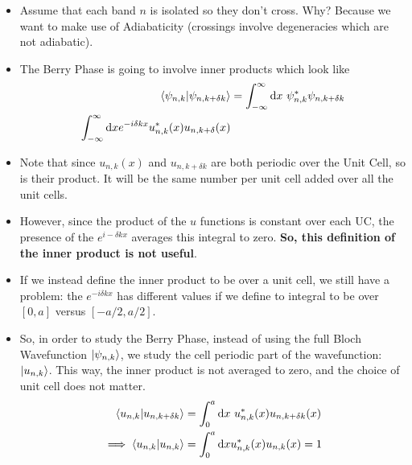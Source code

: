 \documentclass[11pt]{article}
\begin{document}
\begin{itemize}
  \item Assume that each band $n$ is isolated so they don't cross. Why? Because we want to make use of Adiabaticity (crossings involve degeneracies which are not adiabatic).
  \item The Berry Phase is going to involve inner products which look like 
  \begin{align*}
    \langle \psi_{n,k} | \psi_{n,k+\delta k} \rangle &= \int_{-\infty}^{\infty} \mathrm{d}x ~ \psi^*_{n,k} \psi_{n, k+ \delta k} \\
    \int_{-\infty}^{\infty} \mathrm{d}x e^{-i\delta kx} u^*_{n,k}(x) u_{n,k+\delta }(x)
  \end{align*}
  \item Note that since $u_{n,k}(x)$ and $u_{n, k + \delta k}$ are both periodic over the Unit Cell, so is their product. It will be the same number per unit cell added over all the unit cells.
  \item However, since the product of the $u$ functions is constant over each UC, the presence of the $e^{i-\delta k x}$ averages this integral to zero. \textbf{So, this definition of the inner product is not useful}. 
  \item If we instead define the inner product to be over a unit cell, we still have a problem: the $e^{-i\delta k x}$ has different values if we define to integral to be over $[0, a]$ versus $[-a/2, a/2]$.
  \item So, in order to study the Berry Phase, instead of using the full Bloch Wavefunction $\lvert\psi_{n,k}\rangle$, we study the cell periodic part of the wavefunction: $\lvert u_{n,k}\rangle$. This way, the inner product is not averaged to zero, and the choice of unit cell does not matter. 
  \begin{align*}
    \langle u_{n,k} | u_{n,k+\delta k} \rangle &= \int_{0}^{a} \mathrm{d}x ~ u^*_{n,k}(x) u_{n, k + \delta k}(x) \\
    \implies \langle u_{n,k} | u_{n,k} \rangle &= \int_{0}^{a} \mathrm{d}x u^*_{n,k}(x) u_{n,k}(x) = 1
  \end{align*}


\end{itemize}
\end{document}
